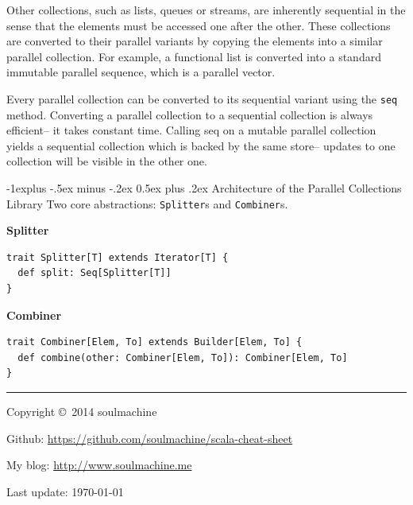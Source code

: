 \documentclass[a4paper,twoside,10pt,landscape]{article}
\makeatletter
\renewcommand{\subsection}{\@startsection{subsection}{2}{0mm}%
                                {-1explus -.5ex minus -.2ex}%
                                {0.5ex plus .2ex}%
                                {\normalfont\normalsize\bfseries}}
\makeatother
\begin{document}
\begin{multicols}{3}
Other collections, such as lists, queues or streams, are inherently sequential in the sense that the elements must be accessed one after the other. These collections are converted to their parallel variants by copying the elements into a similar parallel collection. For example, a functional list is converted into a standard immutable parallel sequence, which is a parallel vector.

Every parallel collection can be converted to its sequential variant using the \texttt{seq} method. Converting a parallel collection to a sequential collection is always efficient– it takes constant time. Calling seq on a mutable parallel collection yields a sequential collection which is backed by the same store– updates to one collection will be visible in the other one.


\subsection{Architecture of the Parallel Collections Library}
Two core abstractions: \texttt{Splitter}s and \texttt{Combiner}s.

\textbf{Splitter}
\begin{verbatim}
trait Splitter[T] extends Iterator[T] {
  def split: Seq[Splitter[T]]
}
\end{verbatim}

\textbf{Combiner}
\begin{verbatim}
trait Combiner[Elem, To] extends Builder[Elem, To] {
  def combine(other: Combiner[Elem, To]): Combiner[Elem, To]
}
\end{verbatim}



\rule{0.3\linewidth}{0.25pt}
\scriptsize

Copyright \copyright\ 2014 soulmachine

Github: \url{https://github.com/soulmachine/scala-cheat-sheet} 

My blog: \url{http://www.soulmachine.me}

Last update: \today


\end{multicols}
\end{document}
